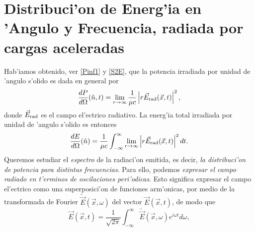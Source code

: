 \section{Distribuci'on de Energ'ia en 'Angulo y Frecuencia, radiada
por cargas aceleradas}

Hab'iamos obtenido, ver \eqref{Pinf1} y \eqref{S2E}, que la potencia irradiada por unidad de 'angulo s'olido es dada en general por
\begin{equation}\label{dp1}
\frac{dP}{d\Omega}(\hat{n},t)=\lim_{r\to\infty}\frac{1}{\mu c}\left|r\vec{E}_{\rm{rad}}(\vec{x},t)\right|^2 , %
\end{equation}
donde $\vec{E}_{\rm{rad}}$ es el campo el'ectrico radiativo.
%
La energ'ia total irradiada por unidad de 'angulo s'olido es entonces
\begin{equation}
\frac{dE}{d\Omega}(\hat{n}) =\frac{1}{\mu c}\int_{-\infty}^{\infty}\lim_{r\to\infty}\left|r\vec{E}_{\rm{rad}}(\vec{x},t)\right|^2 dt .
\end{equation}
Queremos estudiar el \textit{espectro} de la radiaci'on emitida, es decir, \textit{la distribuci'on de potencia para distintas frecuencias}. Para ello, podemos \textit{expresar el campo radiado en t'erminos de oscilaciones peri'odicas}. Esto significa expresar el campo el'ectrico como una superposici'on de funciones arm'onicas, por medio de la transformada de Fourier $\tilde{\vec{E}}(\vec{x},\omega)$ del vector $\vec{E}(\vec{x},t)$, de modo que
\begin{equation}
 \vec{E}(\vec{x},t)=\frac{1}{\sqrt{2\pi}}\int_{-\infty}^{\infty}\tilde{\vec{E}}
(\vec{x},\omega) e^{i\omega t}d\omega ,
\end{equation}
